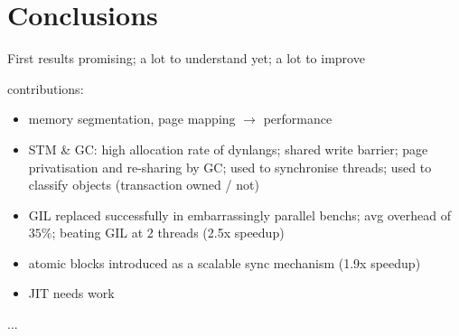 \documentclass{sigplanconf}
\begin{document}
\section{Conclusions}

First results promising; a lot to understand yet; a lot to improve


contributions:
\begin{itemize}
\item memory segmentation, page mapping $\rightarrow$ performance
\item STM \& GC: high allocation rate of dynlangs; shared write barrier;
  page privatisation and re-sharing by GC; used to synchronise threads;
  used to classify objects (transaction owned / not)
\item GIL replaced successfully in embarrassingly parallel benchs;
  avg overhead of $35\%$; beating GIL at 2 threads (2.5x speedup)
\item atomic blocks introduced as a scalable sync mechanism (1.9x speedup)
\item JIT needs work
\end{itemize}





\acks
...





\end{document}
